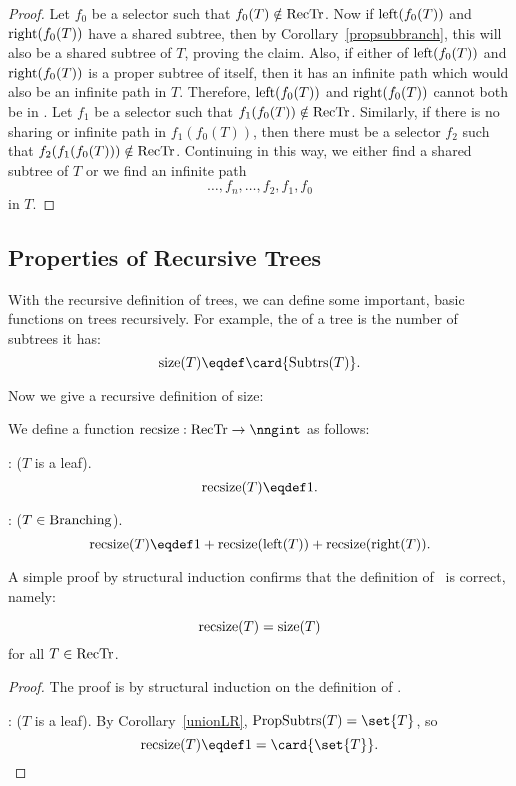 \begin{definition}
\begin{proof}
Let $f_0$ be a selector such that $f_0(T) \notin \text{RecTr}$.  Now if
$\text{left}(f_0(T))$ and $\text{right}(f_0(T))$ have a shared subtree,
then by Corollary~\ref{propsubbranch}, this will also be a shared
subtree of $T$, proving the claim.  Also, if either of
$\text{left}(f_0(T))$ and $\text{right}(f_0(T))$ is a proper subtree of
itself, then it has an infinite path which would also be an infinite
path in $T$.  Therefore, $\text{left}(f_0(T))$ and
$\text{right}(f_0(T))$ cannot both be in \rectr.  Let $f_1$ be a
selector such that $f_1(f_0(T)) \notin \text{RecTr}$.  Similarly, if there
is no sharing or infinite path in $f_1(f_0(T))$, then there must be a
selector $f_2$ such that $f_2(f_1(f_0(T))) \notin \text{RecTr}$.  Continuing
in this way, we either find a shared subtree of $T$ or we find an
infinite path
\[
\dots,f_n,\dots, f_2,f_1,f_0
\]
in $T$.
\end{proof}

\subsection{Properties of Recursive Trees}

With the recursive definition of trees, we can define some important,
basic functions on trees recursively.  For example, the 
 of a tree is the number of subtrees it has:
\begin{equation}\label{treesizedef}
\text{size}(T) \eqdef \card{\subbrn{T}}.
\end{equation}

Now we give a recursive definition of size:
\begin{definition}
We define a function $\trsize{}: \rectr \to \nngint$ as follows:

: ($T$ is a leaf).
\[
\trsize{(T)} \eqdef 1.
\]

: ($T \in \text{Branching}$).
\[
\trsize{(T)} \eqdef 1 + \trsize{(\leftsub{(T)})} + \trsize{(\rightsub{(T)})}.
\]
\end{definition}

A simple proof by structural induction confirms that the definition of
\trsize{}\ is correct, namely:
\begin{lemma}\label{}
\[
\text{recsize}(T) = \text{size}(T)
\]
for all $T \in \text{RecTr}$.

\begin{proof}
The proof is by structural induction on the definition of \rectr.

: ($T$ is a leaf).
By Corollary~\ref{unionLR}, $\propbrn{T} = \set{T}$, so
\[
\trsize{(T)} \eqdef 1 = \card{\set{T}}.
\]


\end{proof}
\end{lemma}
\end{definition}

